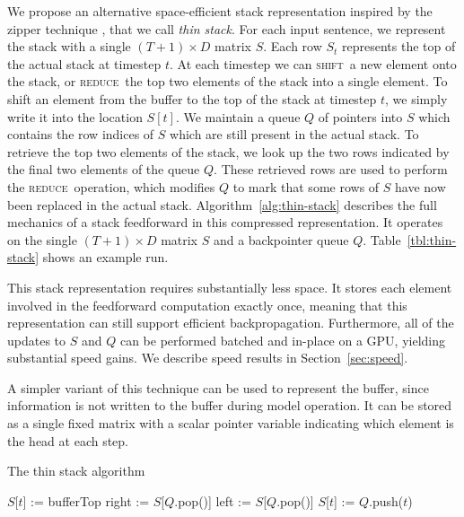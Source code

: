 \documentclass[11pt]{article}
\newcommand{\shift}{\textsc{shift}}
\newcommand{\reduce}{\textsc{reduce}}
\begin{document}
We propose an alternative space-efficient stack representation inspired by the zipper technique \citep{huet1997zipper}, that we call \textit{thin stack}. For each input sentence, we represent the stack with a single $(T + 1) \times D$ matrix $S$. Each row $S_t$ represents the top of the actual stack at timestep $t$. At each timestep we can \shift\ a new element onto the stack, or \reduce\ the top two elements of the stack into a single element. To shift an element from the buffer to the top of the stack at timestep $t$, we simply write it into the location $S[t]$. We maintain a queue $Q$ of pointers into $S$ which contains the row indices of $S$ which are still present in the actual stack. To retrieve the top two elements of the stack, we look up the two rows indicated by the final two elements of the queue $Q$. These retrieved rows are used to perform the \reduce\ operation, which modifies $Q$ to mark that some rows of $S$ have now been replaced in the actual stack. Algorithm~\ref{alg:thin-stack} describes the full mechanics of a stack feedforward in this compressed representation. It operates on the single $(T + 1) \times D$ matrix $S$ and a backpointer queue $Q$. Table~\ref{tbl:thin-stack} shows an example run.

This stack representation requires substantially less space. It stores each element involved in the feedforward computation exactly once, meaning that this representation can still support efficient backpropagation. Furthermore, all of the updates to $S$ and $Q$ can be performed batched and in-place on a GPU, yielding substantial speed gains. We describe speed results in Section~\ref{sec:speed}.

A simpler variant of this technique can be used to represent the buffer, since information is not written to the buffer during model operation. It can be stored as a single fixed matrix with a scalar pointer variable indicating which element is the head at each step.

\begin{algorithm}[t]
\caption{The thin stack algorithm}
\label{alg:thin-stack}
\begin{algorithmic}[1]
    \If{$a$ = \shift}
      \State $S$[$t$] := bufferTop
    \ElsIf{$a$ = \reduce}
      \State right := $S$[$Q$.pop()]
      \State left := $S$[$Q$.pop()]
      \State $S$[$t$] := 
    \EndIf
    \State $Q$.push($t$)
  \EndFunction
\end{algorithmic}
\end{algorithm}
\end{document}

